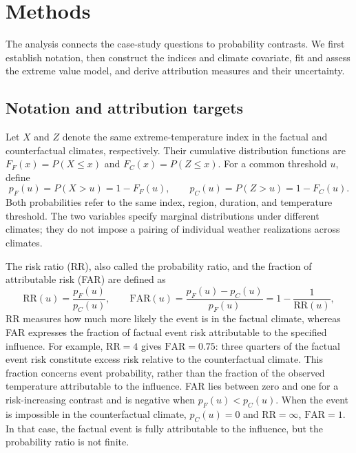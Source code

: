 \documentclass[11pt]{article}
\begin{document}
\section{Methods}
\label{sec:methods}
The analysis connects the case-study questions to probability
contrasts. We first establish notation, then construct the indices and
climate covariate, fit and assess the extreme value model, and derive
attribution measures and their uncertainty.

\subsection{Notation and attribution targets}
\label{sec:notation}
Let $X$ and $Z$ denote the same extreme-temperature index in the
factual and counterfactual climates, respectively. Their cumulative
distribution functions are $F_F(x)=P(X\leq x)$ and $F_C(x)=P(Z\leq
x)$. For a common threshold $u$, define
\begin{equation}
p_F(u)=P(X>u)=1-F_F(u),\qquad
p_C(u)=P(Z>u)=1-F_C(u).
\label{eq:probabilities}
\end{equation}
Both probabilities refer to the same index, region, duration, and
temperature threshold. The two variables specify marginal
distributions under different climates; they do not impose a pairing
of individual weather realizations across climates.

The risk ratio (RR), also called the probability ratio, and the
fraction of attributable risk (FAR) are defined as
\begin{equation}
\mathrm{RR}(u)=\frac{p_F(u)}{p_C(u)},\qquad
\mathrm{FAR}(u)=\frac{p_F(u)-p_C(u)}{p_F(u)}
=1-\frac{1}{\mathrm{RR}(u)},
\label{eq:rr}
\end{equation}
 RR measures how much more likely
the event is in the factual climate, whereas FAR expresses the
fraction of factual event risk attributable to the specified
influence. For example, $\mathrm{RR}=4$
gives $\mathrm{FAR}=0.75$: three quarters of the factual event risk
constitute excess risk relative to the counterfactual climate. This
fraction concerns event probability, rather than the fraction of the
observed temperature attributable to the influence. FAR lies between
zero and one for a risk-increasing contrast and is negative when
$p_F(u)<p_C(u)$. When the event is impossible in the counterfactual climate,
$p_C(u)=0$ and $\mathrm{RR}=\infty$, $\mathrm{FAR}=1$. In that case, the
factual event is fully attributable to the influence, but the
probability ratio is not finite.
\end{document}
